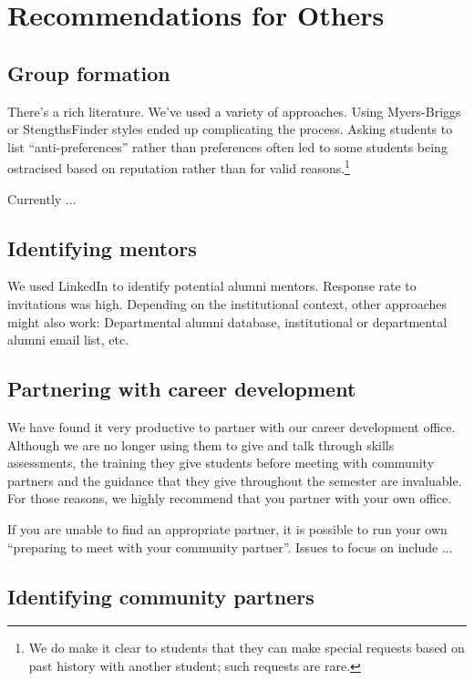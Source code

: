 \section{Recommendations for Others}

\subsection{Group formation}

There's a rich literature.  We've used a variety of approaches.  Using
Myers-Briggs or StengthsFinder styles ended up complicating the process.
Asking students to list ``anti-preferences'' rather than preferences
often led to some students being ostracised based on reputation rather
than for valid reasons.\footnote{We do make it clear to students that
they can make special requests based on past history with another student;
such requests are rare.}

Currently ...

\subsection{Identifying mentors}

We used LinkedIn to identify potential alumni mentors.  Response rate
to invitations was high.  Depending on the institutional context, other
approaches might also work: Departmental alumni database, institutional
or departmental alumni email list, etc.

\subsection{Partnering with career development}

We have found it very productive to partner with our career development
office.  Although we are no longer using them to give and talk through
skills assessments, the training they give students before meeting with
community partners and the guidance that they give throughout the semester
are invaluable.  For those reasons, we highly recommend that you partner
with your own office.

If you are unable to find an appropriate partner, it is possible to run
your own ``preparing to meet with your community partner''.  Issues to
focus on include ...


\subsection{Identifying community partners}

